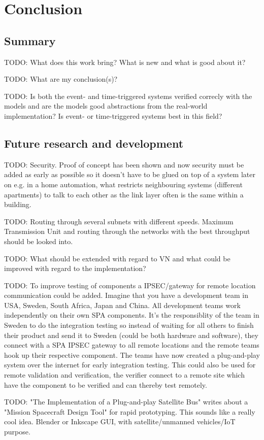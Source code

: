 \chapter{Conclusion}\label{ch:conclusion}
\section{Summary}
TODO: What does this work bring? What is new and what is good about it?

TODO: What are my conclusion(s)?

TODO: Is both the event- and time-triggered systems verified correcly with the
models and are the models good abstractions from the real-world implementation?
Is event- or time-triggered systems best in this field?

\section{Future research and development}
TODO: Security. Proof of concept has been shown and now security must be added
as early as possible so it doesn't have to be glued on top of a system later on
e.g. in a home automation, what restricts neighbouring systems (different
apartments) to talk to each other as the link layer often is the same within a
building.

TODO: Routing through several subnets with different speeds. Maximum
Transmission Unit and routing through the networks with the best throughput
should be looked into.

TODO: What should be extended with regard to VN and what could be improved with
regard to the implementation?

TODO: To improve testing of components a IPSEC/gateway for remote location
communication could be added. Imagine that you have a development team in USA,
Sweden, South Africa, Japan and China. All development teams work independently
on their own SPA components. It's the responsiblity of the team in Sweden to do
the integration testing so instead of waiting for all others to finish their
product and send it to Sweden (could be both hardware and software), they
connect with a SPA IPSEC gateway to all remote locations and the remote teams
hook up their respective component. The teams have now created a plug-and-play
system over the internet for early integration testing. This could also be used
for remote validation and verification, the verifier connect to a remote site
which have the component to be verified and can thereby test remotely.

TODO: "The Implementation of a Plug-and-play Satellite Bus" writes about a
"Mission Spacecraft Design Tool" for rapid prototyping. This sounds like a
really cool idea. Blender or Inkscape GUI, with satellite/unmanned vehicles/IoT
purpose.

